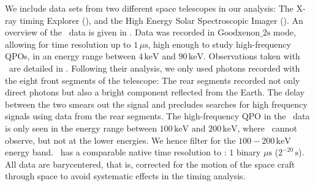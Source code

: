 \documentclass{emulateapj}
\begin{document}
We include data sets from two different space telescopes in our analysis: The  X-ray timing Explorer (\rxte), and the  High Energy Solar Spectroscopic Imager (\rhessi). An overview of the \rxte\ data is given in \citet{Israel05}. Data was recorded in $\mathrm{Goodxenon\_2s}$ mode, allowing for time resolution up to $1 \, \mu \mathrm{s}$, high enough to study high-frequency QPOs, in an energy range between $4 \, \mathrm{keV}$ and $90 \, \mathrm{keV}$.
Observations taken with \rhessi\ are detailed in \citet{Watts06}. Following their analysis, we only used photons recorded with the eight front segments of the telescope: The rear segments recorded not only direct photons but also a bright component reflected from the Earth. The delay between the two smears out the signal and precludes searches for high frequency signals using data from the rear segments. The high-frequency QPO in the \rhessi\ data is only seen in the energy range between $100 \, \mathrm{keV}$ and $200 \, \mathrm{keV}$, where \rxte\ cannot observe, but not at the lower energies. We hence filter for the $100 - 200 \, \mathrm{keV}$ energy band.  \rhessi\ has a comparable native time resolution to \rxte: $1$ binary $\mu\mathrm{s}$ ($2^{-20} \, \mathrm{s}$). All data are barycentered, that is, corrected for the motion of the space craft through space to avoid systematic effects in the timing analysis.
\end{document}
